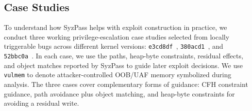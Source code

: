 







\subsection{Case Studies}
To understand how SyzPass helps with exploit construction in practice, we conduct three working privilege-escalation case studies selected from locally triggerable bugs across different kernel versions: \texttt{e3cd8df}~\cite{e3cd8d:online}, \texttt{380acd1}~\cite{380acd}, and \texttt{52bbc0a}~\cite{52bbc}. In each case, we use the paths, heap-byte constraints, residual effects, and object matches reported by SyzPass to guide later exploit decisions. We use \texttt{vulmem} to denote attacker-controlled OOB/UAF memory symbolized during analysis. The three cases cover complementary forms of guidance: CFH constraint guidance, path avoidance plus object matching, and heap-byte constraints for avoiding a residual write.

